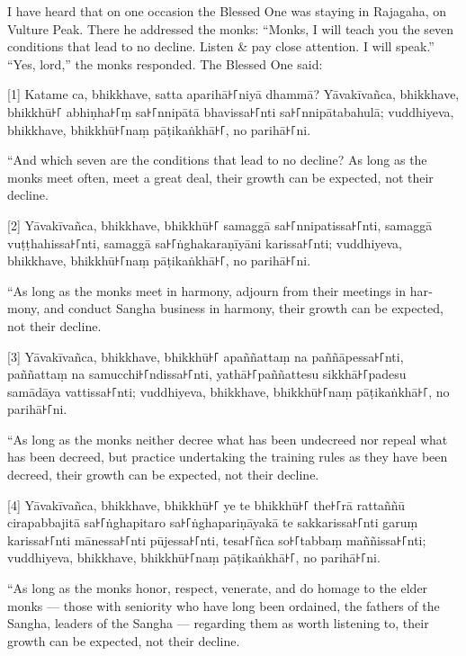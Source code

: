 \begin{english}
  I have heard that on one occasion the Blessed One was staying in Rajagaha, on
  Vulture Peak. There he addressed the monks: “Monks, I will teach you the seven
  conditions that lead to no decline. Listen \& pay close attention. I will
  speak.” “Yes, lord,” the monks responded. The Blessed One said:
\end{english}

[1] Katame ca, bhikkhave, satta aparihā꜔꜒niyā dhammā? Yāvakīvañca, bhikkhave, bhikkhū꜔꜒
abhiṇha꜔꜒ṃ sa꜔꜒nnipātā bhavissa꜔꜒nti sa꜔꜒nnipātabahulā; vuddhiyeva, bhikkhave,
bhikkhū꜔꜒naṃ pāṭikaṅkhā꜔꜒, no parihā꜔꜒ni.

\begin{english}
  “And which seven are the conditions that lead to no decline? As long as the
  monks meet often, meet a great deal, their growth can be expected, not their
  decline.
\end{english}

[2] Yāvakīvañca, bhikkhave, bhikkhū꜔꜒ samaggā sa꜔꜒nnipatissa꜔꜒nti, samaggā
vuṭṭhahissa꜔꜒nti, samaggā sa꜔꜒ṅghakaraṇīyāni karissa꜔꜒nti; vuddhiyeva, bhikkhave,
bhikkhū꜔꜒naṃ pāṭikaṅkhā꜔꜒, no parihā꜔꜒ni.

\begin{english}
  “As long as the monks meet in harmony, adjourn from their meetings in harmony,
  and conduct Sangha business in harmony, their growth can be expected, not
  their decline.
\end{english}

[3] Yāvakīvañca, bhikkhave, bhikkhū꜔꜒ apaññattaṃ na paññāpessa꜔꜒nti, paññattaṃ na
samucchi꜔꜒ndissa꜔꜒nti, yathā꜔꜒paññattesu sikkhā꜔꜒padesu samādāya vattissa꜔꜒nti;
vuddhiyeva, bhikkhave, bhikkhū꜔꜒naṃ pāṭikaṅkhā꜔꜒, no parihā꜔꜒ni.

\begin{english}
  “As long as the monks neither decree what has been undecreed nor repeal what
  has been decreed, but practice undertaking the training rules as they have
  been decreed, their growth can be expected, not their decline.
\end{english}

[4] Yāvakīvañca, bhikkhave, bhikkhū꜔꜒ ye te bhikkhū꜔꜒ the꜔꜒rā rattaññū cirapabbajitā
sa꜔꜒ṅghapitaro sa꜔꜒ṅghapariṇāyakā te sakkarissa꜔꜒nti garuṃ karissa꜔꜒nti mānessa꜔꜒nti
pūjessa꜔꜒nti, tesa꜔꜒ñca so꜔꜒tabbaṃ maññissa꜔꜒nti; vuddhiyeva, bhikkhave, bhikkhū꜔꜒naṃ
pāṭikaṅkhā꜔꜒, no parihā꜔꜒ni.

\begin{english}
  “As long as the monks honor, respect, venerate, and do homage to the elder
  monks — those with seniority who have long been ordained, the fathers of the
  Sangha, leaders of the Sangha — regarding them as worth listening to, their
  growth can be expected, not their decline.
\end{english}

